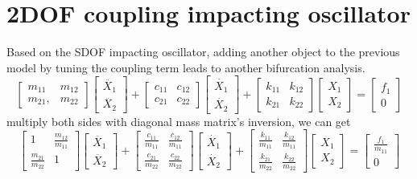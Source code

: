 \documentclass{article}
\begin{document}
\section{2DOF coupling impacting oscillator}
Based on the SDOF impacting oscillator, adding another object to the previous model by tuning the coupling term leads to another bifurcation analysis.
\begin{equation}
\begin{bmatrix} m_{11} & m_{12}\\ m_{21},&m_{22}
\end{bmatrix} \begin{bmatrix}
\ddot{X_1}\\ \ddot{X_2}
\end{bmatrix}+\begin{bmatrix} c_{11} & c_{12}\\ c_{21}& c_{22}
\end{bmatrix} \begin{bmatrix}
\dot{X_1}\\ \dot{X_2}
\end{bmatrix}+\begin{bmatrix} k_{11} & k_{12}\\ k_{21}&k_{22}
\end{bmatrix} \begin{bmatrix}
X_1\\ X_2
\end{bmatrix}=\begin{bmatrix}
f_1\\0
\end{bmatrix}
\end{equation}
%
multiply both sides with diagonal mass matrix's inversion, we can get
\begin{equation}
\begin{bmatrix} 1 & \frac{m_{12}}{m_{11}}\\ \frac{m_{21}}{m_{22}}&1
\end{bmatrix} \begin{bmatrix}
\ddot{X_1}\\ \ddot{X_2}
\end{bmatrix}+\begin{bmatrix} \frac{c_{11}}{m_{11}} & \frac{c_{12}}{m_{11}}\\ \frac{c_{21}}{m_{22}}& \frac{c_{22}}{m_{22}}
\end{bmatrix} \begin{bmatrix}
\dot{X_1}\\ \dot{X_2}
\end{bmatrix}+\begin{bmatrix} \frac{k_{11}}{m_{11}} & \frac{k_{12}}{m_{11}}\\ \frac{k_{21}}{m_{22}}& \frac{k_{22}}{m_{22}}
\end{bmatrix} \begin{bmatrix}
X_1\\ X_2
\end{bmatrix}=\begin{bmatrix}
\frac{f_1}{m_{11}}\\0
\end{bmatrix}
\end{equation}
\end{document}
